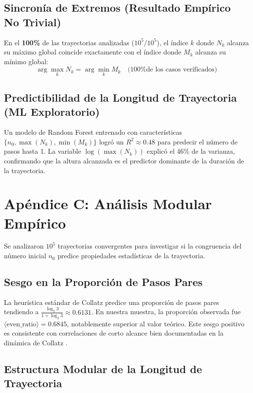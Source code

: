 \documentclass[11pt,a4paper]{article}
\begin{document}
\subsection{Sincronía de Extremos (Resultado Empírico No Trivial)}

En el \textbf{100\%} de las trayectorias analizadas ($10^5 / 10^5$), el índice $k$ donde $N_k$ alcanza su máximo global coincide exactamente con el índice donde $M_k$ alcanza su mínimo global:
\[
\arg\max_k N_k = \arg\min_k M_k \quad \text{(100\% de los casos verificados)}
\]

\subsection{Predictibilidad de la Longitud de Trayectoria (ML Exploratorio)}

Un modelo de Random Forest entrenado con características $\{n_0, \max(N_k), \min(M_k)\}$ logró un $R^2 \approx 0.48$ para predecir el número de pasos hasta 1. La variable $\log(\max(N_k))$ explicó el 46\% de la varianza, confirmando que la altura alcanzada es el predictor dominante de la duración de la trayectoria.

\section{Apéndice C: Análisis Modular Empírico}
\label{app:modular}

Se analizaron $10^5$ trayectorias convergentes para investigar si la congruencia del número inicial $n_0$ predice propiedades estadísticas de la trayectoria.

\subsection{Sesgo en la Proporción de Pasos Pares}

La heurística estándar de Collatz predice una proporción de pasos pares tendiendo a $\frac{\log_2 3}{1+\log_2 3} \approx 0.6131$. En nuestra muestra, la proporción observada fue $\langle \text{even\_ratio} \rangle = 0.6845$, notablemente superior al valor teórico. Este sesgo positivo es consistente con correlaciones de corto alcance bien documentadas en la dinámica de Collatz \cite{lagarias}.

\subsection{Estructura Modular de la Longitud de Trayectoria}
\end{document}
